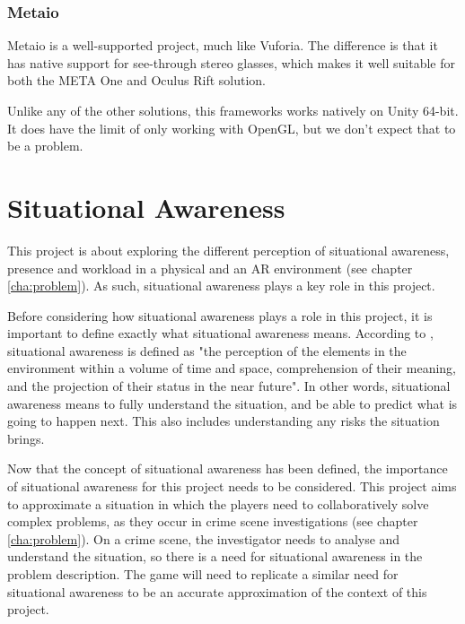 			\subsubsection{Metaio} \label{sssec:metaio}
				Metaio is a well-supported project, much like Vuforia. The
				difference is that it has native support for see-through stereo
				glasses, which makes it well suitable for both the META One and
				Oculus Rift solution. \cite{metaio}

				Unlike any of the other solutions, this frameworks works
				natively on Unity 64-bit. It does have the limit of only working
				with OpenGL, but we don't expect that to be a problem.


	\section{Situational Awareness} \label{sec:awareness}
		This project is about exploring the different perception of situational
		awareness, presence and workload in a physical and an AR environment
		(see chapter \ref{cha:problem}). As such, situational awareness plays a
		key role in this project.

		Before considering how situational awareness plays a role in this
		project, it is important to define exactly what situational awareness
		means. According to \cite{endsley}, situational awareness is defined as
		"the perception of the elements in the environment within a volume of
		time and space, comprehension of their meaning, and the projection of
		their status in the near future". In other words, situational awareness
		means to fully understand the situation, and be able to predict what is
		going to happen next. This also includes understanding any risks the
		situation brings.

		Now that the concept of situational awareness has been defined, the
		importance of situational awareness for this project needs to be
		considered. This project aims to approximate a situation in which the
		players need to collaboratively solve complex problems, as they occur in
		crime scene investigations (see chapter \ref{cha:problem}). On a crime
		scene, the investigator needs to analyse and understand the situation,
		so there is a need for situational awareness in the problem description.
		The game will need to replicate a similar need for situational awareness
		to be an accurate approximation of the context of this project.

